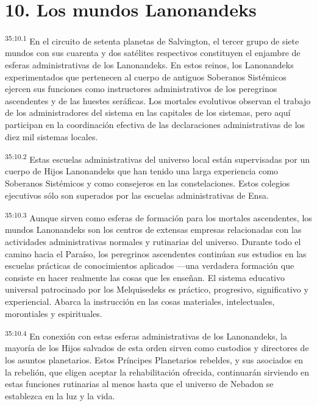 \section*{10. Los mundos Lanonandeks}
\par
\textsuperscript{35:10.1} En el circuito de setenta planetas de Salvington, el tercer grupo de siete mundos con sus cuarenta y dos satélites respectivos constituyen el enjambre de esferas administrativas de los Lanonandeks. En estos reinos, los Lanonandeks experimentados que pertenecen al cuerpo de antiguos Soberanos Sistémicos ejercen sus funciones como instructores administrativos de los peregrinos ascendentes y de las huestes seráficas. Los mortales evolutivos observan el trabajo de los administradores del sistema en las capitales de los sistemas, pero aquí participan en la coordinación efectiva de las declaraciones administrativas de los diez mil sistemas locales.

\par
\textsuperscript{35:10.2} Estas escuelas administrativas del universo local están supervisadas por un cuerpo de Hijos Lanonandeks que han tenido una larga experiencia como Soberanos Sistémicos y como consejeros en las constelaciones. Estos colegios ejecutivos sólo son superados por las escuelas administrativas de Ensa.

\par
\textsuperscript{35:10.3} Aunque sirven como esferas de formación para los mortales ascendentes, los mundos Lanonandeks son los centros de extensas empresas relacionadas con las actividades administrativas normales y rutinarias del universo. Durante todo el camino hacia el Paraíso, los peregrinos ascendentes continúan sus estudios en las escuelas prácticas de conocimientos aplicados ---una verdadera formación que consiste en hacer realmente las cosas que les enseñan. El sistema educativo universal patrocinado por los Melquisedeks es práctico, progresivo, significativo y experiencial. Abarca la instrucción en las cosas materiales, intelectuales, morontiales y espirituales.

\par
\textsuperscript{35:10.4} En conexión con estas esferas administrativas de los Lanonandeks, la mayoría de los Hijos salvados de esta orden sirven como custodios y directores de los asuntos planetarios. Estos Príncipes Planetarios rebeldes, y sus asociados en la rebelión, que eligen aceptar la rehabilitación ofrecida, continuarán sirviendo en estas funciones rutinarias al menos hasta que el universo de Nebadon se establezca en la luz y la vida.

